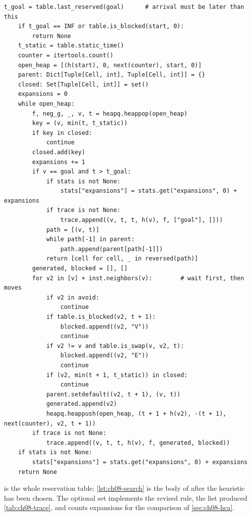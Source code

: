 \begin{lstlisting}[caption={The search loop of Cooperative \astar (from \code{code/ch08\_prioritized.py}). The closed set collapses the time index beyond \code{t\_static}, so no horizon is needed.},label={lst:ch08-search}]
    t_goal = table.last_reserved(goal)      # arrival must be later than this
    if t_goal == INF or table.is_blocked(start, 0):
        return None
    t_static = table.static_time()
    counter = itertools.count()
    open_heap = [(h(start), 0, next(counter), start, 0)]
    parent: Dict[Tuple[Cell, int], Tuple[Cell, int]] = {}
    closed: Set[Tuple[Cell, int]] = set()
    expansions = 0
    while open_heap:
        f, neg_g, _, v, t = heapq.heappop(open_heap)
        key = (v, min(t, t_static))
        if key in closed:
            continue
        closed.add(key)
        expansions += 1
        if v == goal and t > t_goal:
            if stats is not None:
                stats["expansions"] = stats.get("expansions", 0) + expansions
            if trace is not None:
                trace.append((v, t, t, h(v), f, ["goal"], []))
            path = [(v, t)]
            while path[-1] in parent:
                path.append(parent[path[-1]])
            return [cell for cell, _ in reversed(path)]
        generated, blocked = [], []
        for v2 in [v] + inst.neighbors(v):        # wait first, then moves
            if v2 in avoid:
                continue
            if table.is_blocked(v2, t + 1):
                blocked.append((v2, "V"))
                continue
            if v2 != v and table.is_swap(v, v2, t):
                blocked.append((v2, "E"))
                continue
            if (v2, min(t + 1, t_static)) in closed:
                continue
            parent.setdefault((v2, t + 1), (v, t))
            generated.append(v2)
            heapq.heappush(open_heap, (t + 1 + h(v2), -(t + 1), next(counter), v2, t + 1))
        if trace is not None:
            trace.append((v, t, t, h(v), f, generated, blocked))
    if stats is not None:
        stats["expansions"] = stats.get("expansions", 0) + expansions
    return None
\end{lstlisting}

 is the whole reservation table; \cref{lst:ch08-search} is the
body of  after the heuristic has been chosen. The optional
 set implements the revised rule, the  list produced
\cref{tab:ch08-trace}, and  counts expansions for the comparison of
\cref{sec:ch08-hca}.


